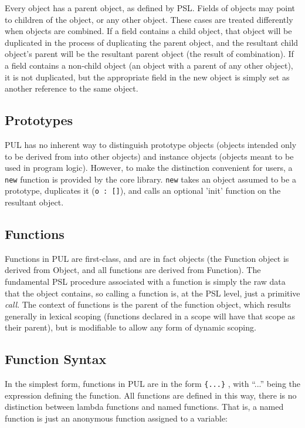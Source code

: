 Every object has a parent object, as defined by PSL. Fields of objects may point to children of the object, or any other object. These cases are treated differently when objects are combined. If a field contains a child object, that object will be duplicated in the process of duplicating the parent object, and the resultant child object's parent will be the resultant parent object (the result of combination). If a field contains a non-child object (an object with a parent of any other object), it is not duplicated, but the appropriate field in the new object is simply set as another reference to the same object.



\subsection{Prototypes}

PUL has no inherent way to distinguish prototype objects (objects intended only to be derived from into other objects) and instance objects (objects meant to be used in program logic). However, to make the distinction convenient for users, a \texttt{new} function is provided by the core library. \texttt{new} takes an object assumed to be a prototype, duplicates it (\texttt{o : []}), and calls an optional 'init' function on the resultant object.



\subsection{Functions}

Functions in PUL are first-class, and are in fact objects (the Function object is derived from Object, and all functions are derived from Function). The fundamental PSL procedure associated with a function is simply the raw data that the object contains, so calling a function is, at the PSL level, just a primitive \textit{call}. The context of functions is the parent of the function object, which results generally in lexical scoping (functions declared in a scope will have that scope as their parent), but is modifiable to allow any form of dynamic scoping.



\subsection{Function Syntax}

In the simplest form, functions in PUL are in the form \texttt{\{...\}} , with ``...'' being the expression defining the function. All functions are defined in this way, there is no distinction between lambda functions and named functions. That is, a named function is just an anonymous function assigned to a variable:

